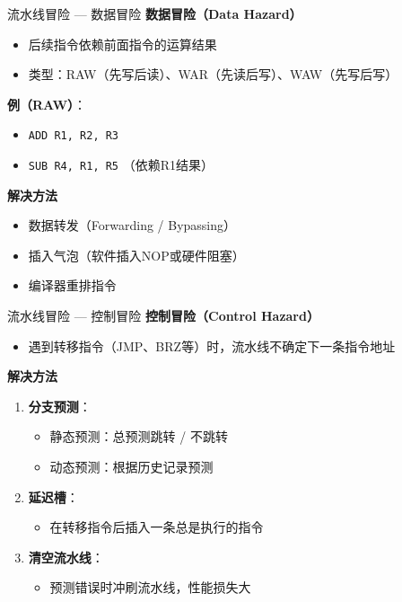 \documentclass[10pt, aspectratio=169]{beamer}
\begin{document}
\begin{frame}{流水线冒险 --- 数据冒险}
    \textbf{数据冒险（Data Hazard）}
    \begin{itemize}
        \item 后续指令依赖前面指令的运算结果
        \item 类型：RAW（先写后读）、WAR（先读后写）、WAW（先写后写）
    \end{itemize}
    \vspace{0.3em}
    \textbf{例（RAW）}：
    \begin{itemize}
        \item \texttt{ADD R1, R2, R3}
        \item \texttt{SUB R4, R1, R5} \quad （依赖R1结果）
    \end{itemize}
    \vspace{0.3em}
    \textbf{解决方法}
    \begin{itemize}
        \item 数据转发（Forwarding / Bypassing）
        \item 插入气泡（软件插入NOP或硬件阻塞）
        \item 编译器重排指令
    \end{itemize}
\end{frame}

\begin{frame}{流水线冒险 --- 控制冒险}
    \textbf{控制冒险（Control Hazard）}
    \begin{itemize}
        \item 遇到转移指令（JMP、BRZ等）时，流水线不确定下一条指令地址
    \end{itemize}
    \vspace{0.3em}
    \textbf{解决方法}
    \begin{enumerate}
        \item \textbf{分支预测}：
            \begin{itemize}
                \item 静态预测：总预测跳转 / 不跳转
                \item 动态预测：根据历史记录预测
            \end{itemize}
        \item \textbf{延迟槽}：
            \begin{itemize}
                \item 在转移指令后插入一条总是执行的指令
            \end{itemize}
        \item \textbf{清空流水线}：
            \begin{itemize}
                \item 预测错误时冲刷流水线，性能损失大
            \end{itemize}
    \end{enumerate}
\end{frame}
\end{document}
